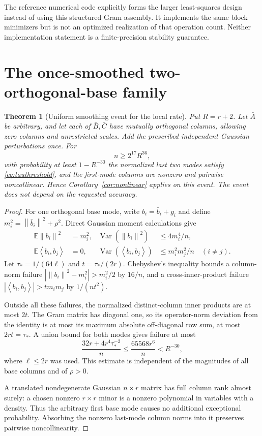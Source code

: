 \documentclass[11pt]{article}
\newtheorem{theorem}{Theorem}[section]
\theoremstyle{remark}\newtheorem{remark}[theorem]{Remark}
\newcommand{\norm}[1]{\left\lVert#1\right\rVert}
\newcommand{\ip}[2]{\left\langle#1,#2\right\rangle}
\begin{document}
The reference numerical code explicitly forms the larger least-squares design instead of using this structured Gram assembly. It implements the same block minimizers but is not an optimized realization of that operation count. Neither implementation statement is a finite-precision stability guarantee.

\section{The once-smoothed two-orthogonal-base family}
\begin{theorem}[Uniform smoothing event for the local rate]\label{thm:smoothing}
Put $R=r+2$. Let $\bar A$ be arbitrary, and let each of $\bar B,\bar C$ have mutually orthogonal columns, allowing zero columns and unrestricted scales. Add the prescribed independent Gaussian perturbations once. For
\begin{equation}\label{eq:dimension}
 n\ge 2^{17}R^{36},
\end{equation}
with probability at least $1-R^{-30}$ the normalized last two modes satisfy \eqref{eq:tauthreshold}, and the first-mode columns are nonzero and pairwise noncollinear. Hence Corollary~\ref{cor:nonlinear} applies on this event. The event does not depend on the requested accuracy.
\end{theorem}
\begin{proof}
For one orthogonal base mode, write $b_i=\bar b_i+g_i$ and define
$m_i^2=\norm{\bar b_i}^2+\rho^2$. Direct Gaussian moment calculations give
\begin{align*}
 \mathbb E\norm{b_i}^2&=m_i^2,&
 \operatorname{Var}(\norm{b_i}^2)&\le4m_i^4/n,\\
 \mathbb E\ip{b_i}{b_j}&=0,&
 \operatorname{Var}(\ip{b_i}{b_j})&\le m_i^2m_j^2/n\quad(i\ne j).
\end{align*}
Let $\tau_*=1/(64\ell)$ and $t=\tau_*/(2r)$. Chebyshev's inequality bounds a column-norm failure
$|\norm{b_i}^2-m_i^2|>m_i^2/2$ by $16/n$, and a cross-inner-product failure
$|\ip{b_i}{b_j}|>t m_i m_j$ by $1/(nt^2)$.

Outside all these failures, the normalized distinct-column inner products are at most $2t$. The Gram matrix has diagonal one, so its operator-norm deviation from the identity is at most its maximum absolute off-diagonal row sum, at most $2rt=\tau_*$. A union bound for both modes gives failure at most
\[
 \frac{32r+4r^4\tau_*^{-2}}{n}
 \le\frac{65568r^6}{n}<R^{-30},
\]
where $\ell\le2r$ was used. This estimate is independent of the magnitudes of all base columns and of $\rho>0$.

A translated nondegenerate Gaussian $n\times r$ matrix has full column rank almost surely: a chosen nonzero $r\times r$ minor is a nonzero polynomial in variables with a density. Thus the arbitrary first base mode causes no additional exceptional probability. Absorbing the nonzero last-mode column norms into it preserves pairwise noncollinearity.
\end{proof}
\end{document}
